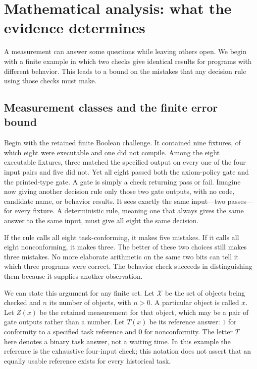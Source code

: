 \section{Mathematical analysis: what the evidence determines}
\label{sec:mathematics}

A measurement can answer some questions while leaving others open. We begin with a finite example in which two checks give identical results for programs with different behavior. This leads to a bound on the mistakes that any decision rule using those checks must make.

\subsection{Measurement classes and the finite error bound}
\label{sec:measurement-classes}

Begin with the retained finite Boolean challenge. It contained nine fixtures,
of which eight were executable and one did not compile. Among the eight
executable fixtures, three matched the specified output on every one of the
four input pairs and five did not. Yet all eight passed both the axiom-policy
gate and the printed-type gate. A gate is simply a check returning pass or
fail. Imagine now giving another decision rule only those two gate outputs,
with no code, candidate name, or behavior results. It sees exactly the same
input---two passes---for every fixture. A deterministic rule, meaning one
that always gives the same answer to the same input, must give all eight the
same decision.

If the rule calls all eight task-conforming, it makes five mistakes. If it
calls all eight nonconforming, it makes three. The better of these two choices
still makes three mistakes. No more elaborate arithmetic on the same two bits
can tell it which three programs were correct. The behavior check succeeds
in distinguishing them because it supplies another observation.

We can state this argument for any finite set. Let $\mathcal X$ be the set of
objects being checked and $n$ its number of objects, with $n>0$. A particular
object is called $x$. Let $Z(x)$ be the retained measurement for that object,
which may be a pair of gate outputs rather than a number. Let $T(x)$ be its
reference answer: $1$ for conformity to a specified task reference and $0$
for nonconformity. The letter $T$ here denotes a binary task answer, not a
waiting time. In this example the reference is the exhaustive four-input
check; this notation does not assert that an equally usable reference exists
for every historical task.

